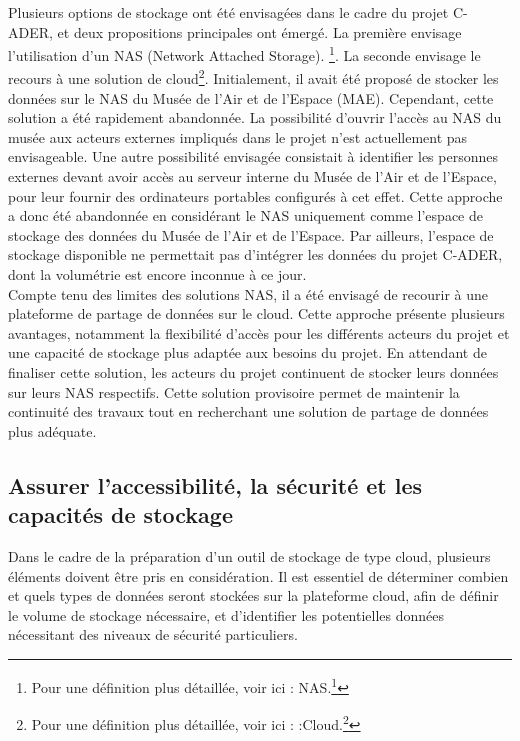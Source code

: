 Plusieurs options de stockage ont été envisagées dans le cadre du projet C-ADER, et deux propositions principales ont émergé. La première envisage l'utilisation d'un NAS (Network Attached Storage). \footnote{Pour une définition plus détaillée, voir ici : \gls{NAS}.\footcite{ServeurStockageReseau2023}}. La seconde envisage le recours à une solution de cloud\footnote{Pour une définition plus détaillée, voir ici : :\gls{Cloud}.\footcite{CloudComputingQu2024}}. 
Initialement, il avait été proposé de stocker les données sur le NAS du Musée de l'Air et de l'Espace (MAE). Cependant, cette solution a été rapidement abandonnée. La possibilité d'ouvrir l'accès au NAS du musée aux acteurs externes impliqués dans le projet n'est actuellement pas envisageable. Une autre possibilité envisagée consistait à identifier les personnes externes devant avoir accès au serveur interne du Musée de l'Air et de l'Espace, pour leur fournir des ordinateurs portables configurés à cet effet. Cette approche a donc été abandonnée en considérant le NAS uniquement comme l'espace de stockage des données du Musée de l'Air et de l'Espace. Par ailleurs, l'espace de stockage disponible ne permettait pas d'intégrer les données du projet C-ADER, dont la volumétrie est encore inconnue à ce jour.\\

Compte tenu des limites des solutions NAS, il a été envisagé de recourir à une plateforme de partage de données sur le cloud. Cette approche présente plusieurs avantages, notamment la flexibilité d'accès pour les différents acteurs du projet et une capacité de stockage plus adaptée aux besoins du projet. En attendant de finaliser cette solution, les acteurs du projet continuent de stocker leurs données sur leurs NAS respectifs. Cette solution provisoire permet de maintenir la continuité des travaux tout en recherchant une solution de partage de données plus adéquate.

        \subsection{Assurer l'accessibilité, la sécurité et les capacités de stockage}

Dans le cadre de la préparation d'un outil de stockage de type cloud, plusieurs éléments doivent être pris en considération. Il est essentiel de déterminer combien et quels types de données seront stockées sur la plateforme cloud, afin de définir le volume de stockage nécessaire, et d'identifier les potentielles données nécessitant des niveaux de sécurité particuliers. 

